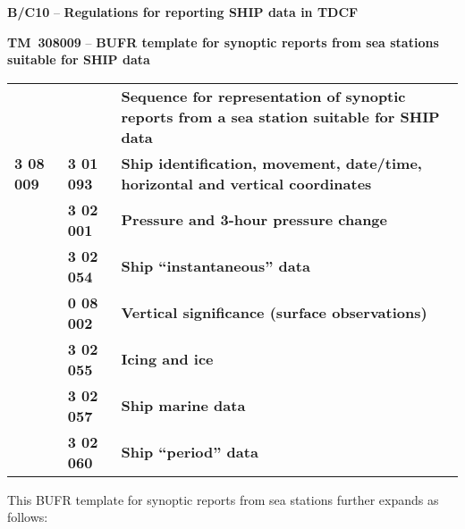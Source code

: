 \textbf{B/C10} -- \textbf{Regulations for reporting SHIP data in TDCF}

\textbf{TM~308009} -- \textbf{BUFR template for synoptic reports from sea stations suitable for SHIP data}

\begin{longtable}[]{@{}lll@{}}
\toprule
\endhead
& & \textbf{Sequence for representation of synoptic reports from a sea station suitable for SHIP data}\tabularnewline
\textbf{3 08 009} & \textbf{3 01 093} & \textbf{Ship identification, movement, date/time, horizontal and vertical coordinates}\tabularnewline
& \textbf{3 02 001} & \textbf{Pressure and 3-hour pressure change}\tabularnewline
& \textbf{3 02 054} & \textbf{Ship ``instantaneous'' data}\tabularnewline
& \textbf{0 08 002} & \textbf{Vertical significance (surface observations)}\tabularnewline
& \textbf{3 02 055} & \textbf{Icing and ice}\tabularnewline
& \textbf{3 02 057} & \textbf{Ship marine data}\tabularnewline
& \textbf{3 02 060} & \textbf{Ship ``period'' data}\tabularnewline
\bottomrule
\end{longtable}

This BUFR template for synoptic reports from sea stations further expands as follows:


